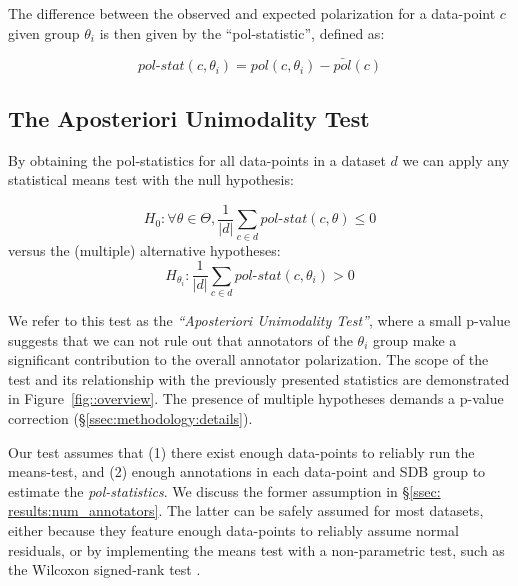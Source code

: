 \documentclass{article}
\begin{document}
 The difference between the observed and expected polarization for a data-point $c$ given group $\theta_i$ is then given by the ``pol-statistic'', defined as: 

 \begin{equation}
	\textit{pol-stat}(c, \theta_i)  = pol(c, \theta_i) - \bar{pol}(c)
\end{equation}


\subsection{The Aposteriori Unimodality Test}
\label{ssec:methodology:aposteriori}

By obtaining the pol-statistics for all data-points in a dataset $d$ we can apply any statistical means test with the null hypothesis:

\begin{equation}
	\label{eq:null_h}
	H_0: \forall \theta \in \Theta, \frac{1}{\lvert d \rvert} \sum\limits_{c \in d} \textit{pol-stat}(c, \theta) \le 0
\end{equation}
\noindent versus the (multiple) alternative hypotheses: 
\begin{equation}
	\label{eq:alt_h}
	H_{\theta_i}:\frac{1}{\lvert d \rvert} \sum\limits_{c \in d} \textit{pol-stat}(c, \theta_i) >  0
\end{equation}

We refer to this test as the \textit{``Aposteriori Unimodality Test''}, where a small p-value suggests that we can not rule out that annotators of the $\theta_i$ group make a significant contribution to the overall annotator polarization. The scope of the test and its relationship with the previously presented statistics are demonstrated in Figure~\ref{fig::overview}. The presence of multiple hypotheses demands a p-value correction (\S\ref{ssec:methodology:details}).

Our test assumes that (1) there exist enough data-points to reliably run the means-test, and (2) enough annotations in each data-point and \ac{SDB} group to estimate the \textit{pol-statistics}. We discuss the former assumption in \S\ref{ssec: results:num_annotators}. The latter can be safely assumed for most datasets, either because they feature enough data-points to reliably assume normal residuals, or by implementing the means test with a non-parametric test, such as the Wilcoxon signed-rank test \parencite{wilcoxon-1945}.
\end{document}
